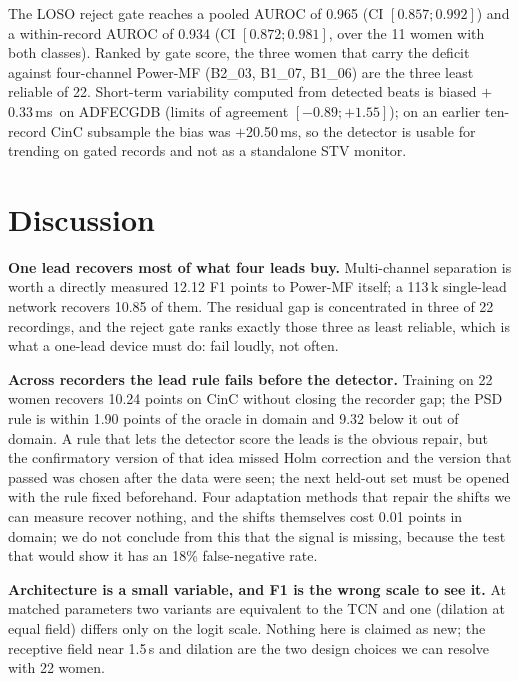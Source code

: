 \documentclass[10pt,twocolumn,a4paper]{article}
\newcommand{\ms}{\,ms}
\begin{document}
The LOSO reject gate reaches a pooled AUROC of 0.965 (CI $[0.857;0.992]$) and a within-record AUROC of
0.934 (CI $[0.872;0.981]$, over the 11 women with both classes). Ranked by gate score, the three women
that carry the deficit against four-channel Power-MF (B2\_03, B1\_07, B1\_06) are the three least
reliable of 22. Short-term variability computed from detected beats is biased $+$0.33\ms\ on ADFECGDB
(limits of agreement $[-0.89;+1.55]$); on an earlier ten-record CinC subsample the bias was
$+$20.50\ms, so the detector is usable for trending on gated records and not as a standalone STV
monitor.

\section{Discussion}
\textbf{One lead recovers most of what four leads buy.} Multi-channel separation is worth a
directly measured 12.12 F1 points to Power-MF itself; a 113\,k single-lead network recovers 10.85
of them. The residual gap is concentrated in three of 22 recordings, and the reject gate ranks
exactly those three as least reliable, which is what a one-lead device must do: fail loudly, not
often.

\textbf{Across recorders the lead rule fails before the detector.} Training on 22 women recovers 10.24 points on
CinC without closing the recorder gap; the PSD rule is within 1.90 points of the oracle in domain and
9.32 below it out of domain. A rule that lets the detector score the leads is the obvious repair, but
the confirmatory version of that idea missed Holm correction and the version that passed was chosen
after the data were seen; the next held-out set must be opened with the rule fixed beforehand.
Four adaptation methods that repair the shifts we can measure recover nothing, and the shifts
themselves cost 0.01 points in domain; we do not conclude from this that the signal is missing,
because the test that would show it has an 18\% false-negative rate.

\textbf{Architecture is a small variable, and F1 is the wrong scale to see it.} At matched
parameters two variants are equivalent to the TCN and one (dilation at equal field) differs only on
the logit scale. Nothing here is claimed as new; the receptive field near 1.5\,s and dilation
are the two design choices we can resolve with 22 women.
\end{document}

